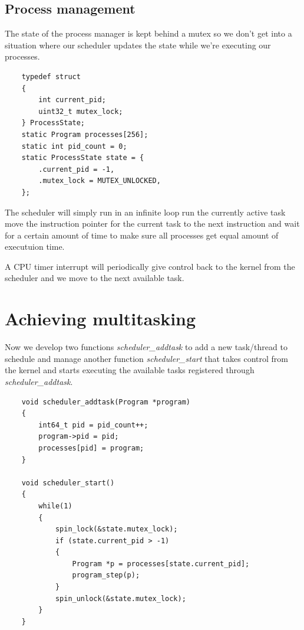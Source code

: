 \documentclass[12pt]{report}
\begin{document}
	\subsection{Process management}
	The state of the process manager is kept behind a mutex so we don't get into a situation
	where our scheduler updates the state while we're executing our processes.
 
	\begin{verbatim}
	typedef struct
	{
		int current_pid;
		uint32_t mutex_lock;
	} ProcessState;
	static Program processes[256];
	static int pid_count = 0;
	static ProcessState state = {
   	    .current_pid = -1,
   	    .mutex_lock = MUTEX_UNLOCKED,
	};
	\end{verbatim}
	
	The scheduler will simply run in an infinite loop run the currently active task
	move the instruction pointer for the current task to the next instruction and wait for
	a certain amount of time to make sure all processes get equal amount of executuion time.
	
	A CPU timer interrupt will periodically give control back to the kernel from the
	scheduler and we move to the next available task.

    \section{Achieving multitasking}
    Now we develop two functions \textit{scheduler\_addtask} to add a new task/thread
    to schedule and manage another function \textit{scheduler\_start} that takes control from
    the kernel and starts executing the available tasks registered through \textit{scheduler\_addtask}.

    \begin{verbatim}
    void scheduler_addtask(Program *program)
    {
        int64_t pid = pid_count++;
        program->pid = pid;
        processes[pid] = program;
    }

    void scheduler_start()
    {
        while(1) 
        {
            spin_lock(&state.mutex_lock);
            if (state.current_pid > -1)
            {
                Program *p = processes[state.current_pid];
                program_step(p);
            }
            spin_unlock(&state.mutex_lock);
        }
    }
    \end{verbatim}
    
    \begin{verbatim}
        
    \end{verbatim}
\end{document}

